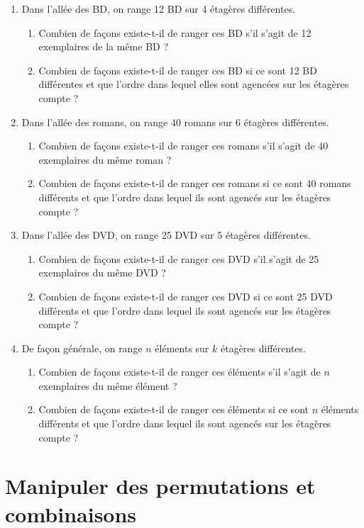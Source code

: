 \documentclass[a4paper,11pt]{article}
\begin{document}
\begin{enumerate}
\item Dans l'allée des BD, on range 12 BD sur 4 étagères différentes.
\begin{enumerate}
\item Combien de façons existe-t-il de ranger ces BD s'il s'agit de 12 exemplaires de la même BD ?
\item Combien de façons existe-t-il de ranger ces BD si ce sont 12 BD différentes et que l'ordre dans lequel elles sont agencées sur les étagères compte ?
\end{enumerate}

\item Dans l'allée des romans, on range 40 romans sur 6 étagères différentes.
\begin{enumerate}
\item Combien de façons existe-t-il de ranger ces romans s'il s'agit de 40 exemplaires du même roman ?
\item Combien de façons existe-t-il de ranger ces romans si ce sont 40 romans différents et que l'ordre dans lequel ils sont agencés sur les étagères compte ?
\end{enumerate}

\item Dans l'allée des DVD, on range 25 DVD sur 5 étagères différentes.
\begin{enumerate}
\item Combien de façons existe-t-il de ranger ces DVD s'il s'agit de 25 exemplaires du même DVD ?
\item Combien de façons existe-t-il de ranger ces DVD si ce sont 25 DVD différents et que l'ordre dans lequel ils sont agencés sur les étagères compte ?
\end{enumerate}

\item De façon générale, on range $n$ éléments sur $k$ étagères différentes.
\begin{enumerate}
\item Combien de façons existe-t-il de ranger ces éléments s'il s'agit de $n$ exemplaires du même élément ?
\item Combien de façons existe-t-il de ranger ces éléments si ce sont $n$ éléments différents et que l'ordre dans lequel ils sont agencés sur les étagères compte ?
\end{enumerate}
\end{enumerate}

\section{Manipuler des permutations et combinaisons}
\end{document}
